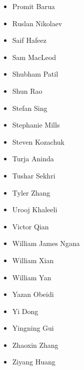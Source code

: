 \documentclass[main.tex]{subfiles}
\begin{document}
\begin{multicols}{3}
\begin{itemize}[label={},noitemsep]
     \item {Promit Barua}
	 \item {Ruslan Nikolaev}
     \item {Saif Hafeez}
	 \item {Sam MacLeod}
     \item {Shubham Patil}
	 \item {Shun Rao}
     \item {Stefan Sing}
	 \item {Stephanie Mills}
     \item {Steven Kozachuk}
     \item {Turja Aninda}
	 \item {Tushar Sekhri}
     \item {Tyler Zhang}
	 \item {Urooj Khaleeli}
     \item {Victor Qian}
	 \item {William James Ngana}
     \item {William Xian}
	 \item {William Yan}
     \item {Yazan Obeidi}
	 \item {Yi Dong}
     \item {Yingning Gui}
	 \item {Zhaoxin Zhang}
     \item {Ziyang Huang}
\end{itemize}
\end{multicols}
\newpage
\end{document}
